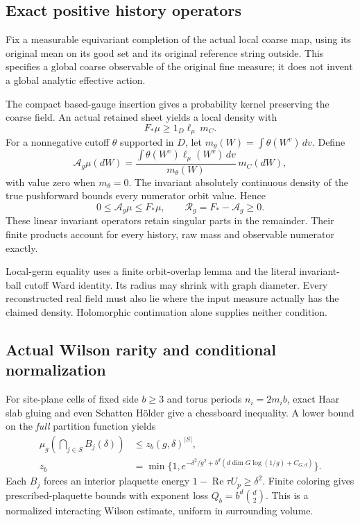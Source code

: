 \documentclass[11pt]{article}
\theoremstyle{remark}
\begin{document}
\subsection{Exact positive history operators}

Fix a measurable equivariant completion of the actual local
coarse map, using its original mean on its good set and
its original reference string outside. This specifies a
global coarse observable of the original fine measure;
it does not invent a global analytic effective action.

The compact based-gauge insertion gives a probability
kernel preserving the coarse field. An actual retained
sheet yields a local density with
\[
                  F_*\mu\ge 1_D\ell_\mu\,m_C.
\]
For a nonnegative cutoff \(\theta\) supported in \(D\),
let \(m_\theta(W)=\int\theta(W^v)\,dv\). Define
\[
 \mathcal A_g\mu(dW)=
 \frac{\int\theta(W^v)\ell_\mu(W^v)\,dv}{m_\theta(W)}\,m_C(dW),
\]
with value zero when \(m_\theta=0\). The invariant
absolutely continuous density of the true pushforward
bounds every numerator orbit value. Hence
\[
       0\le\mathcal A_g\mu\le F_*\mu,\qquad
       \mathcal R_g=F_*-\mathcal A_g\ge0.
\]
These linear invariant operators retain singular parts
in the remainder. Their finite products account for
every history, raw mass and observable numerator exactly.

Local-germ equality uses a finite orbit-overlap lemma
and the literal invariant-ball cutoff Ward identity.
Its radius may shrink with graph diameter. Every
reconstructed real field must also lie where the input
measure actually has the claimed density.
Holomorphic continuation alone supplies neither condition.

\subsection{Actual Wilson rarity and conditional normalization}

For site-plane cells of fixed side \(b\ge3\) and torus
periods \(n_i=2m_i b\), exact Haar slab gluing and even
Schatten H\"older give a chessboard inequality.
A lower bound on the \emph{full} partition function yields
\begin{align*}
 \mu_g\left(\bigcap_{j\in S}B_j(\delta)\right)
 &\le z_b(g,\delta)^{|S|},\\
 z_b&=\min\{1,e^{-\delta^2/g^2+
       b^d(d\dim G\log(1/g)+C_{G,d})}\}.
\end{align*}
Each \(B_j\) forces an interior plaquette energy
\(1-\operatorname{Re}\tau U_p\ge\delta^2\).
Finite coloring gives prescribed-plaquette bounds with
exponent loss \(Q_b=b^d\binom d2\).
This is a normalized interacting Wilson estimate,
uniform in surrounding volume.
\end{document}
